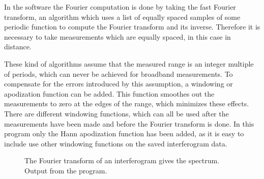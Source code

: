 In the software the Fourier computation is done by taking the fast Fourier transform, an algorithm which uses a list of equally spaced samples of some periodic function to compute the Fourier transform and its inverse. Therefore it is necessary to take measurements which are equally spaced, in this case in distance.

These kind of algorithms assume that the measured range is an integer multiple of periods, which can never be achieved for broadband measurements. To compensate for the errors introduced by this assumption, a windowing or apodization function can be added. This function smoothes out the measurements to zero at the edges of the range, which minimizes these effects. There are different windowing functions, which can all be used after the measurements have been made and before the Fourier transform is done. In this program only the Hann apodization function has been added, as it is easy to include use other windowing functions on the saved interferogram data.

\begin{figure}
 \begin{center}
  \quad
  \caption{The Fourier transform of an interferogram gives the spectrum. Output from the program.}
  \label{fig:fouriertransform}
 \end{center}
\end{figure}

